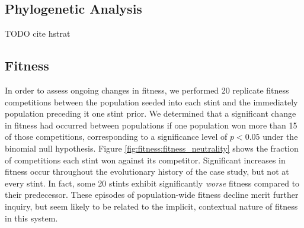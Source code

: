 

\subsection{Phylogenetic Analysis}






TODO cite hstrat

\subsection{Fitness}



In order to assess ongoing changes in fitness, we performed 20 replicate fitness competitions between the population seeded into each stint and the immediately population preceding it one stint prior.
We determined that a significant change in fitness had occurred between populations if one population won more than 15 of those competitions, corresponding to a significance level of $p < 0.05$ under the binomial null hypothesis.
Figure \ref{fig:fitness:fitness_neutrality} shows the fraction of competitions each stint won against its competitor.
Significant increases in fitness occur throughout the evolutionary history of the case study, but not at every stint.
In fact, some 20 stints exhibit significantly \textit{worse} fitness compared to their predecessor.
These episodes of population-wide fitness decline merit further inquiry, but seem likely to be related to the implicit, contextual nature of fitness in this system.

